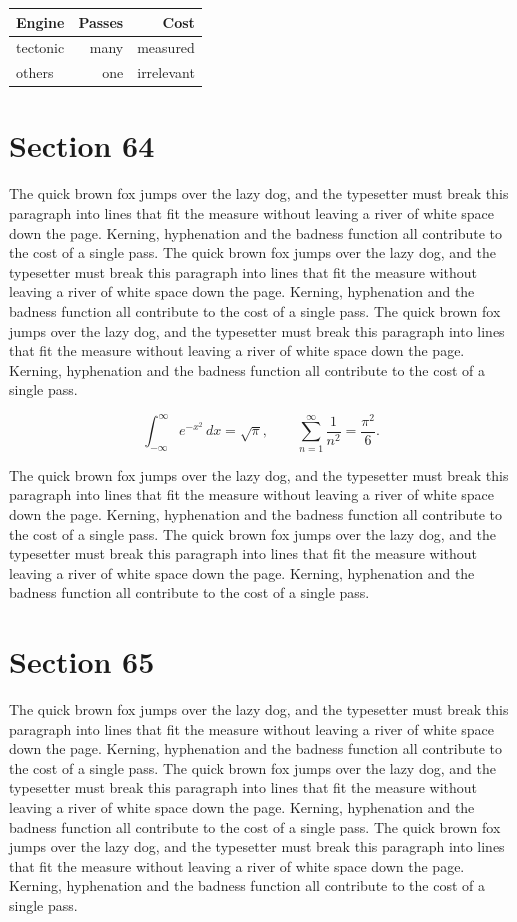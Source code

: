 \documentclass{article}
\begin{document}
\begin{center}
\begin{tabular}{lrr}
\toprule
Engine & Passes & Cost \\
\midrule
tectonic & many & measured \\
others & one & irrelevant \\
\bottomrule
\end{tabular}
\end{center}

\section{Section 64}
The quick brown fox jumps over the lazy dog, and the typesetter must break this paragraph into lines that fit the measure without leaving a river of white space down the page. Kerning, hyphenation and the badness function all contribute to the cost of a single pass. The quick brown fox jumps over the lazy dog, and the typesetter must break this paragraph into lines that fit the measure without leaving a river of white space down the page. Kerning, hyphenation and the badness function all contribute to the cost of a single pass. The quick brown fox jumps over the lazy dog, and the typesetter must break this paragraph into lines that fit the measure without leaving a river of white space down the page. Kerning, hyphenation and the badness function all contribute to the cost of a single pass. 

\begin{equation}
\int_{-\infty}^{\infty} e^{-x^{2}}\,dx = \sqrt{\pi}, \qquad
\sum_{n=1}^{\infty} \frac{1}{n^{2}} = \frac{\pi^{2}}{6}.
\end{equation}

The quick brown fox jumps over the lazy dog, and the typesetter must break this paragraph into lines that fit the measure without leaving a river of white space down the page. Kerning, hyphenation and the badness function all contribute to the cost of a single pass. The quick brown fox jumps over the lazy dog, and the typesetter must break this paragraph into lines that fit the measure without leaving a river of white space down the page. Kerning, hyphenation and the badness function all contribute to the cost of a single pass. 
\section{Section 65}
The quick brown fox jumps over the lazy dog, and the typesetter must break this paragraph into lines that fit the measure without leaving a river of white space down the page. Kerning, hyphenation and the badness function all contribute to the cost of a single pass. The quick brown fox jumps over the lazy dog, and the typesetter must break this paragraph into lines that fit the measure without leaving a river of white space down the page. Kerning, hyphenation and the badness function all contribute to the cost of a single pass. The quick brown fox jumps over the lazy dog, and the typesetter must break this paragraph into lines that fit the measure without leaving a river of white space down the page. Kerning, hyphenation and the badness function all contribute to the cost of a single pass. 
\end{document}
